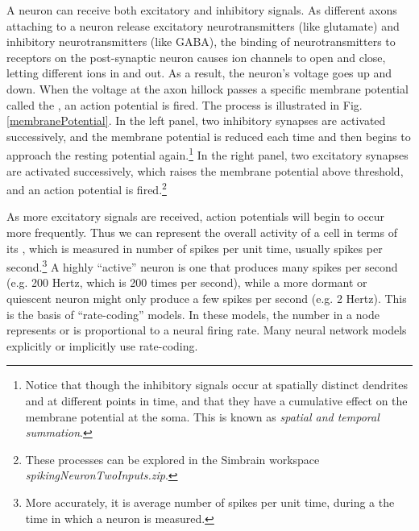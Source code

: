 A neuron can receive both excitatory and inhibitory signals. As different axons attaching to a neuron release excitatory neurotransmitters (like glutamate) and inhibitory neurotransmitters (like GABA), the binding of neurotransmitters to receptors on the post-synaptic neuron causes ion channels to open and close, letting different ions in and out. As a result, the neuron's voltage goes up and down. When the voltage at the axon hillock passes a specific membrane potential called the , an action potential is fired. The process is illustrated in Fig. \ref{membranePotential}. In the left panel, two inhibitory synapses are activated successively,  and the membrane potential is reduced each time and then begins to approach the resting potential again.\footnote{Notice that though the inhibitory signals occur at spatially distinct dendrites and at different points in time, and that they have a cumulative effect on the membrane potential at the soma. This is known as \emph{spatial and temporal summation}.}  In the right panel, two excitatory synapses are activated successively, which raises the membrane potential above threshold, and an action potential is fired.\footnote{These processes can be explored in the Simbrain workspace \emph{spikingNeuronTwoInputs.zip}.}



As more excitatory signals are received, action potentials will begin to occur more frequently. Thus we can represent the overall activity of a cell in terms of its , which is measured in number of spikes per unit time, usually spikes per second.\footnote{More accurately, it is average number of spikes per unit time, during a the time in which a neuron is measured.}   A highly ``active'' neuron is one that produces many spikes per second (e.g. 200 Hertz, which is 200 times per second), while a more dormant or quiescent neuron might only produce a few spikes per second (e.g. 2 Hertz). This is the basis of ``rate-coding'' models. In these models, the number in a node represents or is proportional to a neural firing rate. Many neural network models explicitly or implicitly use rate-coding.

